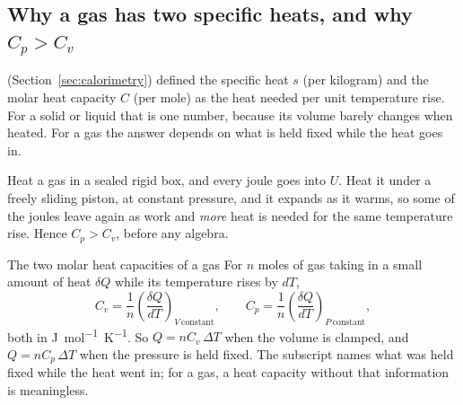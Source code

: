 \subsection{Why a gas has two specific heats, and why \texorpdfstring{$C_p>C_v$}{Cp > Cv}}

 (Section~\ref{sec:calorimetry}) defined the specific heat $s$ (per kilogram) and the molar heat capacity $C$ (per
mole) as the heat needed per unit temperature rise. For a solid or liquid that is one number, because
its volume barely changes when heated. For a gas the answer depends on what is held fixed while the heat
goes in.

Heat a gas in a sealed rigid box, and every joule goes into $U$. Heat it under a freely sliding piston, at
constant pressure, and it expands as it warms, so some of the joules leave again as work and \emph{more}
heat is needed for the same temperature rise. Hence $C_p>C_v$, before any algebra.


\begin{defbox}{The two molar heat capacities of a gas}
For $n$ moles of gas taking in a small amount of heat $\delta Q$ while its temperature rises by $dT$,
\[
C_v=\frac{1}{n}\left(\frac{\delta Q}{dT}\right)_{V\ \text{constant}},
\qquad
C_p=\frac{1}{n}\left(\frac{\delta Q}{dT}\right)_{P\ \text{constant}},
\]
both in \si{J.mol^{-1}.K^{-1}}. So $Q=nC_v\,\Delta T$ when the volume is clamped, and $Q=nC_p\,\Delta T$
when the pressure is held fixed. The subscript names what was held fixed while the heat went in; for a gas,
a heat capacity without that information is meaningless.
\end{defbox}


